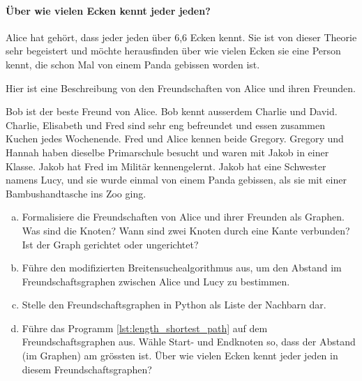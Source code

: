 \paragraph{Über wie vielen Ecken kennt jeder jeden?}
Alice hat gehört, dass jeder jeden über 6,6 Ecken kennt. Sie ist von dieser Theorie sehr begeistert und möchte herausfinden über wie vielen Ecken sie eine Person kennt, die schon Mal von einem Panda gebissen worden ist.

\begin{aufgabe}\label{aufgabe_panda_gebissen}
Hier ist eine Beschreibung von den Freundschaften von Alice und ihren Freunden.
\begin{displayquote}
Bob ist der beste Freund von Alice. Bob kennt ausserdem Charlie und David. Charlie, Elisabeth und Fred sind sehr eng befreundet und essen zusammen Kuchen jedes Wochenende. Fred und Alice kennen beide Gregory. Gregory und Hannah haben dieselbe Primarschule besucht und waren mit Jakob in einer Klasse. Jakob hat Fred im Militär kennengelernt. Jakob hat eine Schwester namens Lucy, und sie wurde einmal von einem Panda gebissen, als sie mit einer Bambushandtasche ins Zoo ging.
\end{displayquote}

\begin{enumerate}[(a)]
    \item Formalisiere die Freundschaften von Alice und ihrer Freunden als Graphen. Was sind die Knoten? Wann sind zwei Knoten durch eine Kante verbunden? Ist der Graph gerichtet oder ungerichtet?
    \item Führe den modifizierten Breitensuchealgorithmus aus, um den Abstand im Freundschaftsgraphen zwischen Alice und Lucy zu bestimmen.
    \item Stelle den Freundschaftsgraphen in Python als Liste der Nachbarn dar.
    \item Führe das Programm \ref{lst:length_shortest_path} auf dem Freundschaftsgraphen aus. Wähle Start- und Endknoten so, dass der Abstand (im Graphen) am grössten ist. Über wie vielen Ecken kennt jeder jeden in diesem Freundschaftsgraphen? 
\end{enumerate}

\end{aufgabe}

